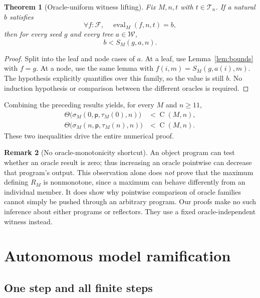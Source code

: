 \documentclass[11pt,letterpaper]{article}
\newtheorem{theorem}{Theorem}[section]
\theoremstyle{definition}
\newtheorem{remark}[theorem]{Remark}
\newcommand{\W}{\mathcal W}
\newcommand{\Fam}{\mathcal F}
\newcommand{\Eval}{\operatorname{eval}}
\newcommand{\Val}{\operatorname{C}}
\newcommand{\ps}{\mathsf p}
\begin{document}
\begin{theorem}[Oracle-uniform witness lifting]\label{thm:lifting}
Fix $M,n,t$ with $t\in\mathcal T_n$. If a natural $b$ satisfies
\[
                 \forall f:\Fam,\quad\Eval_M(f,n,t)=b,
\]
then for every seed $g$ and every tree $a\in\W$,
\[
                         b<S_M(g,a,n).
\]
\end{theorem}
\begin{proof}
Split into the leaf and node cases of $a$. At a leaf, use
Lemma~\ref{lem:bounds} with $f=g$. At a node, use the same lemma with
$f(i,m)=S_M(g,a(i),m)$. The hypothesis explicitly quantifies over this family,
so the value is still $b$. No induction hypothesis or comparison between the
different oracles is required.
\end{proof}

Combining the preceding results yields, for every $M$ and $n\ge11$,
\begin{align}
 \Theta\bigl(\sigma_M(0,\ps,\tau_M(0),n)\bigr)&<\Val(M,n),
       \label{eq:zero-margin}\\
 \Theta\bigl(\sigma_M(n,\ps,\tau_M(n),n)\bigr)&<\Val(M,n).
       \label{eq:input-margin}
\end{align}
These two inequalities drive the entire numerical proof.

\begin{remark}[No oracle-monotonicity shortcut]
An object program can test whether an oracle result is zero; thus increasing
an oracle pointwise can decrease that program's output. This observation
alone does \emph{not} prove that the maximum defining $R_M$ is nonmonotone,
since a maximum can behave differently from an individual member. It does
show why pointwise comparison of oracle families cannot simply be pushed
through an arbitrary program. Our proofs make no such inference about either
programs or reflectors. They use a fixed oracle-independent witness instead.
\end{remark}

\section{Autonomous model ramification}
\label{sec:models}

\subsection{One step and all finite steps}
\end{document}
